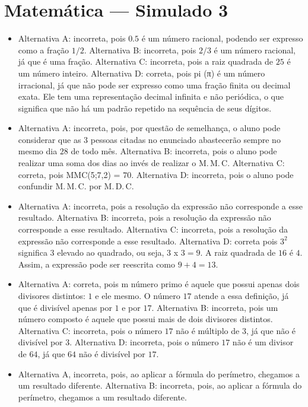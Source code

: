 \section*{Matemática — Simulado 3}

\begin{itemize}
\item Alternativa A: incorreta, pois $0.5$ é um número racional, podendo ser
expresso como a fração $1/2$. Alternativa B: incorreta, pois $2/3$ é um
número racional, já que é uma fração. Alternativa C: incorreta, pois a
raiz quadrada de $25$ é um número inteiro. Alternativa D: correta, pois pi
(π) é um número irracional, já que não pode ser expresso como uma fração
finita ou decimal exata. Ele tem uma representação decimal infinita e
não periódica, o que significa que não há um padrão repetido na
sequência de seus dígitos.
\item Alternativa A: incorreta, pois, por questão de semelhança, o aluno pode
considerar que as $3$ pessoas citadas no enunciado abastecerão sempre no
mesmo dia $28$ de todo mês.
Alternativa B: incorreta, pois o aluno pode realizar uma soma dos dias
ao invés de realizar o M.\,M.\,C.
Alternativa C: correta, pois MMC(5;7,2) = $70$. 
Alternativa D: incorreta, pois o aluno pode confundir M.\,M.\,C. por M.\,D.\,C.
\item Alternativa A: incorreta, pois a resolução da expressão não corresponde
a esse resultado.
Alternativa B: incorreta, pois a resolução da expressão não corresponde
a esse resultado.
Alternativa C: incorreta, pois a resolução da expressão não corresponde
a esse resultado.
Alternativa D: correta pois $3^2$ significa $3$ elevado ao quadrado, ou seja,
3 x $3 = 9$. A raiz quadrada de $16$ é $4$. Assim, a expressão pode ser
reescrita como $9 + 4 = 13$.
\item Alternativa A: correta, pois m número primo é aquele que possui apenas
dois divisores distintos: $1$ e ele mesmo. O número $17$ atende a essa
definição, já que é divisível apenas por $1$ e por $17$.
Alternativa B: incorreta, pois um número composto é aquele que possui
mais de dois divisores distintos.
Alternativa C: incorreta, pois o número $17$ não é múltiplo de $3$, já que
não é divisível por $3$.
Alternativa D: incorreta, pois o número $17$ não é um divisor de $64$, já
que $64$ não é divisível por $17$.
\item Alternativa A, incorreta, pois, ao aplicar a fórmula do perímetro,
chegamos a um resultado diferente.
Alternativa B: incorreta, pois, ao aplicar a fórmula do perímetro,
chegamos a um resultado diferente.

\end{itemize}
